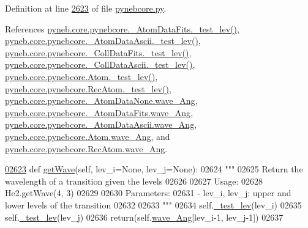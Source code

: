 Definition at line \hyperlink{pynebcore_8py_source_l02623}{2623} of file \hyperlink{pynebcore_8py_source}{pynebcore.\+py}.



References \hyperlink{pynebcore_8py_source_l00171}{pyneb.\+core.\+pynebcore.\+\_\+\+Atom\+Data\+Fits.\+\_\+test\+\_\+lev()}, \hyperlink{pynebcore_8py_source_l00435}{pyneb.\+core.\+pynebcore.\+\_\+\+Atom\+Data\+Ascii.\+\_\+test\+\_\+lev()}, \hyperlink{pynebcore_8py_source_l00660}{pyneb.\+core.\+pynebcore.\+\_\+\+Coll\+Data\+Fits.\+\_\+test\+\_\+lev()}, \hyperlink{pynebcore_8py_source_l01026}{pyneb.\+core.\+pynebcore.\+\_\+\+Coll\+Data\+Ascii.\+\_\+test\+\_\+lev()}, \hyperlink{pynebcore_8py_source_l01459}{pyneb.\+core.\+pynebcore.\+Atom.\+\_\+test\+\_\+lev()}, \hyperlink{pynebcore_8py_source_l02596}{pyneb.\+core.\+pynebcore.\+Rec\+Atom.\+\_\+test\+\_\+lev()}, \hyperlink{pynebcore_8py_source_l00057}{pyneb.\+core.\+pynebcore.\+\_\+\+Atom\+Data\+None.\+wave\+\_\+\+Ang}, \hyperlink{pynebcore_8py_source_l00165}{pyneb.\+core.\+pynebcore.\+\_\+\+Atom\+Data\+Fits.\+wave\+\_\+\+Ang}, \hyperlink{pynebcore_8py_source_l00426}{pyneb.\+core.\+pynebcore.\+\_\+\+Atom\+Data\+Ascii.\+wave\+\_\+\+Ang}, \hyperlink{pynebcore_8py_source_l01198}{pyneb.\+core.\+pynebcore.\+Atom.\+wave\+\_\+\+Ang}, and \hyperlink{pynebcore_8py_source_l02613}{pyneb.\+core.\+pynebcore.\+Rec\+Atom.\+wave\+\_\+\+Ang}.


\begin{DoxyCode}
\hypertarget{classpyneb_1_1core_1_1pynebcore_1_1_rec_atom_l02623}{}\hyperlink{classpyneb_1_1core_1_1pynebcore_1_1_rec_atom_a4c99566f33409cee77076ca8735568f0}{02623}     \textcolor{keyword}{def }\hyperlink{classpyneb_1_1core_1_1pynebcore_1_1_rec_atom_a4c99566f33409cee77076ca8735568f0}{getWave}(self, lev\_i=None, lev\_j=None):
02624         \textcolor{stringliteral}{"""}
02625 \textcolor{stringliteral}{        Return the wavelength of a transition given the levels}
02626 \textcolor{stringliteral}{        }
02627 \textcolor{stringliteral}{        Usage:}
02628 \textcolor{stringliteral}{            He2.getWave(4, 3) }
02629 \textcolor{stringliteral}{            }
02630 \textcolor{stringliteral}{        Parameters:}
02631 \textcolor{stringliteral}{            - lev\_i, lev\_j: upper and lower levels of the transition}
02632 \textcolor{stringliteral}{                }
02633 \textcolor{stringliteral}{        """} 
02634         self.\hyperlink{classpyneb_1_1core_1_1pynebcore_1_1_rec_atom_a271f5e8992df0412c6fdca611ac87a5d}{\_test\_lev}(lev\_i)
02635         self.\hyperlink{classpyneb_1_1core_1_1pynebcore_1_1_rec_atom_a271f5e8992df0412c6fdca611ac87a5d}{\_test\_lev}(lev\_j)
02636         return(self.\hyperlink{classpyneb_1_1core_1_1pynebcore_1_1_rec_atom_aa2fd61021ea3067af77e7ee0053ace11}{wave\_Ang}[lev\_i-1, lev\_j-1])
02637         
\end{DoxyCode}
\hypertarget{classpyneb_1_1core_1_1pynebcore_1_1_rec_atom_a20b990d9d745db7be03fdaac8390f919}{}
